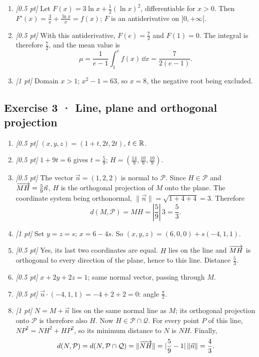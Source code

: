 \begin{enumerate}
\item \textit{[0.5 pt]} Let $F(x)=3\ln x+\frac12(\ln x)^2$, differentiable for $x>0$. Then $F'(x)=\frac{3}{x}+\frac{\ln x}{x}=f(x)$; $F$ is an antiderivative on $]0,+\infty[$.

\item \textit{[0.5 pt]} With this antiderivative, $F(e)=\frac{7}{2}$ and $F(1)=0$. The integral is therefore $\frac{7}{2}$, and the mean value is
\[\mu=\frac{1}{e-1}\int_1^e f(x)\,\dd x=\frac{7}{2(e-1)}.\]

\item \textit{[1 pt]} Domain $x>1$; $x^2-1=63$, so $x=8$, the negative root being excluded.

\end{enumerate}

\subsection*{Exercise 3 · Line, plane and orthogonal projection}\begin{enumerate}

\item \textit{[0.5 pt]} $(x,y,z)=(1+t,2t,2t)$, $t\in\mathbb R$.

\item \textit{[0.5 pt]} $1+9t=6$ gives $t=\frac{5}{9}$; $H=(\frac{14}{9},\frac{10}{9},\frac{10}{9})$.

\item \textit{[0.5 pt]} The vector $\vec n=(1,2,2)$ is normal to $\mathcal P$. Since $H\in\mathcal P$ and $\overrightarrow{MH}=\frac{5}{9}\vec n$, $H$ is the orthogonal projection of $M$ onto the plane. The coordinate system being orthonormal, $\|\vec n\|=\sqrt{1+4+4}=3$. Therefore
\[d(M,\mathcal P)=MH=|\frac{5}{9}|\,3=\frac{5}{3}.\]

\item \textit{[1 pt]} Set $y=z=s$; $x=6-4s$. So $(x,y,z)=(6,0,0)+s(-4,1,1)$.

\item \textit{[0.5 pt]} Yes, its last two coordinates are equal. $H$ lies on the line and $\overrightarrow{MH}$ is orthogonal to every direction of the plane, hence to this line. Distance $\frac{5}{3}$.

\item \textit{[0.5 pt]} $x+2y+2z=1$; same normal vector, passing through $M$.

\item \textit{[0.5 pt]} $\vec n\cdot(-4,1,1)=-4+2+2=0$: angle $\frac{\pi}{2}$.

\item \textit{[1 pt]} $N=M+\vec n$ lies on the same normal line as $M$; its orthogonal projection onto $\mathcal P$ is therefore also $H$. Now $H\in\mathcal P\cap\mathcal Q$. For every point $P$ of this line, $NP^2=NH^2+HP^2$, so its minimum distance to $N$ is $NH$. Finally,
\[d(N,\mathcal P)=d(N,\mathcal P\cap\mathcal Q)=\|\overrightarrow{NH}\|=|\frac{5}{9}-1|\,\|\vec n\|=\frac{4}{3}.\]

\end{enumerate}


